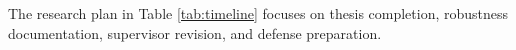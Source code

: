 \documentclass[12pt,a4paper]{article}
\numberwithin{equation}{section}
\begin{document}
The research plan in Table \ref{tab:timeline} focuses on thesis completion, robustness documentation, supervisor revision, and defense preparation.



\clearpage

\end{document}

